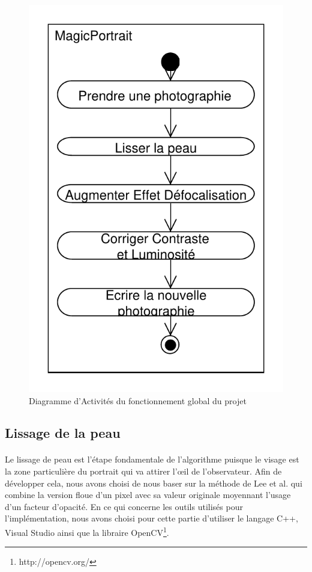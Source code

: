 \documentclass[11pt, french]{report-rd-info}
\begin{document}
\begin{figure}
\centering
\includegraphics[scale=0.5]{Diagrammes/DiagrammeActivites_00_Global}
\caption{Diagramme d'Activités du fonctionnement global du projet}
\label{diag:diagramme00}
\end{figure}





\subsection{Lissage de la peau}
\paragraph*{}
Le lissage de peau est l'étape fondamentale de l'algorithme puisque le visage est la zone particulière du portrait qui va attirer l'œil de l'observateur. Afin de développer cela, nous avons choisi de nous baser sur la méthode de Lee et al. \cite{Lee} qui combine la version floue d'un pixel avec sa valeur originale moyennant l'usage d'un facteur d'opacité. En ce qui concerne les outils utilisés pour l’implémentation, nous avons choisi pour cette partie d'utiliser le langage C++, Visual Studio ainsi que la libraire OpenCV\footnote{http://opencv.org/}.
\end{document}
